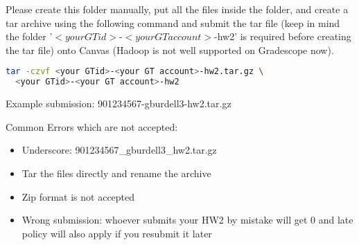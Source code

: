 \documentclass[12pt]{article}
\begin{document}
Please create this folder manually, put all the files inside the folder, and create a tar archive using the following command and submit the tar file (keep in mind the folder '$<your GTid>$-$<your GT account>$-hw2' is required before creating the tar file) onto Canvas (Hadoop is not well supported on Gradescope now).
\begin{lstlisting}[language=bash,frame=single]
tar -czvf <your GTid>-<your GT account>-hw2.tar.gz \
  <your GTid>-<your GT account>-hw2
\end{lstlisting}
Example submission: 901234567-gburdell3-hw2.tar.gz
\newline

\noindent Common Errors which are not accepted:
\begin{itemize}
\item Underscore: 901234567\_gburdell3\_hw2.tar.gz   
\item Tar the files directly and rename the archive
\item Zip format is not accepted
\item Wrong submission: whoever submits your HW2 by mistake will get 0 and late policy will also apply if you resubmit it later
\end{itemize}
\end{document}
